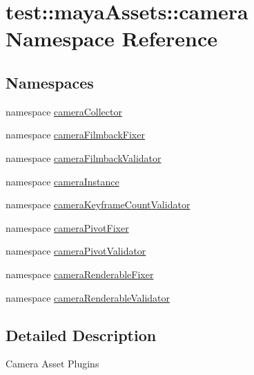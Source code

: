 \hypertarget{namespacetest_1_1mayaAssets_1_1camera}{\section{test\-:\-:maya\-Assets\-:\-:camera \-Namespace \-Reference}
\label{dc/d5e/namespacetest_1_1mayaAssets_1_1camera}
}
\subsection*{\-Namespaces}
\begin{DoxyCompactItemize}
\item 
namespace \hyperlink{namespacetest_1_1mayaAssets_1_1camera_1_1cameraCollector}{camera\-Collector}
\item 
namespace \hyperlink{namespacetest_1_1mayaAssets_1_1camera_1_1cameraFilmbackFixer}{camera\-Filmback\-Fixer}
\item 
namespace \hyperlink{namespacetest_1_1mayaAssets_1_1camera_1_1cameraFilmbackValidator}{camera\-Filmback\-Validator}
\item 
namespace \hyperlink{namespacetest_1_1mayaAssets_1_1camera_1_1cameraInstance}{camera\-Instance}
\item 
namespace \hyperlink{namespacetest_1_1mayaAssets_1_1camera_1_1cameraKeyframeCountValidator}{camera\-Keyframe\-Count\-Validator}
\item 
namespace \hyperlink{namespacetest_1_1mayaAssets_1_1camera_1_1cameraPivotFixer}{camera\-Pivot\-Fixer}
\item 
namespace \hyperlink{namespacetest_1_1mayaAssets_1_1camera_1_1cameraPivotValidator}{camera\-Pivot\-Validator}
\item 
namespace \hyperlink{namespacetest_1_1mayaAssets_1_1camera_1_1cameraRenderableFixer}{camera\-Renderable\-Fixer}
\item 
namespace \hyperlink{namespacetest_1_1mayaAssets_1_1camera_1_1cameraRenderableValidator}{camera\-Renderable\-Validator}
\end{DoxyCompactItemize}


\subsection{\-Detailed \-Description}
\begin{DoxyVerb}
Camera Asset Plugins
\end{DoxyVerb}
 